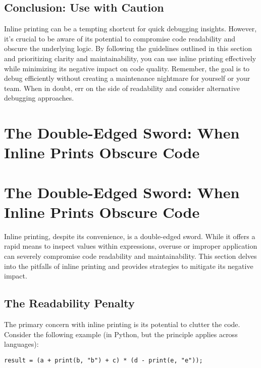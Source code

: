 \documentclass{article}
\begin{document}
{{{{\subsection*{Conclusion: Use with Caution}

Inline printing can be a tempting shortcut for quick debugging insights. However, it's crucial to be aware of its potential to compromise code readability and obscure the underlying logic. By following the guidelines outlined in this section and prioritizing clarity and maintainability, you can use inline printing effectively while minimizing its negative impact on code quality.  Remember, the goal is to debug efficiently without creating a maintenance nightmare for yourself or your team.  When in doubt, err on the side of readability and consider alternative debugging approaches.

\newpage

\section*{The Double-Edged Sword: When Inline Prints Obscure Code} %
\label{chapter-6-2-The_Double-Edged_Sword__When_Inline_Prin}

\section*{The Double-Edged Sword: When Inline Prints Obscure Code}

Inline printing, despite its convenience, is a double-edged sword. While it offers a rapid means to inspect values within expressions, overuse or improper application can severely compromise code readability and maintainability. This section delves into the pitfalls of inline printing and provides strategies to mitigate its negative impact.

\subsection*{The Readability Penalty}

The primary concern with inline printing is its potential to clutter the code. Consider the following example (in Python, but the principle applies across languages):

\begin{verbatim}
result = (a + print(b, "b") + c) * (d - print(e, "e"));
\end{verbatim}

}}}}
\end{document}
